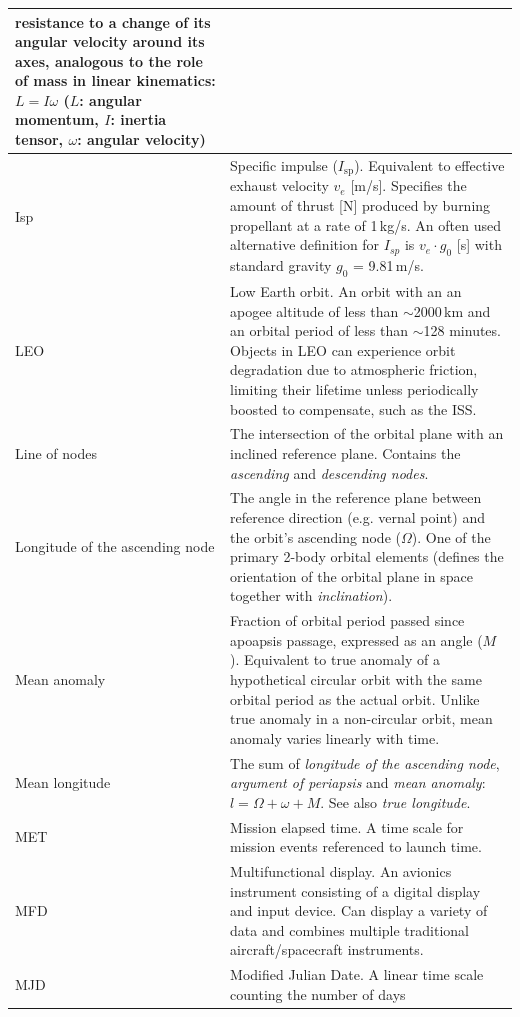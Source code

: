 \documentclass[Orbiter User Manual.tex]{subfiles}
\begin{document}
\begin{longtable}{ >{\RaggedRight}p{} p{} }
		resistance to a change of its angular velocity around its axes,
		analogous to the role of mass in linear kinematics: $L = I\omega$ ($L$:
		angular momentum, $I$: inertia tensor, $\omega$: angular velocity)\\
	\hline
	Isp & Specific impulse ($I_\mathrm{sp}$). Equivalent to effective exhaust
		velocity $v_{e}$ [m/s]. Specifies the amount of thrust [N] produced by
		burning propellant at a rate of 1\,kg/s. An often used alternative
		definition for $I_{sp}$ is $v_{e} \cdot g_{0}$ [s] with standard gravity
		$g_{0}$ = 9.81\,m/s\textsup{2}.\\
	\hline
	LEO & Low Earth orbit. An orbit with an an apogee altitude of less than
		$\sim$2000\,km and an orbital period of less than $\sim$128 minutes.
		Objects in LEO can experience orbit degradation due to atmospheric
		friction, limiting their lifetime unless periodically boosted to
		compensate, such as the ISS.\\
	\hline
	Line of nodes & The intersection of the orbital plane with an inclined
		reference plane. Contains the \emph{ascending} and \emph{descending
		nodes}.\\
	\hline
	Longitude of the ascending node & The angle in the reference plane between
		reference direction (e.g. vernal point) and the orbit's ascending node
		($\Omega$). One of the primary 2-body orbital elements (defines the
		orientation of the orbital plane in space together with
		\emph{inclination}).\\
	\hline
	Mean anomaly & Fraction of orbital period passed since apoapsis passage,
		expressed as an angle ($M$). Equivalent to true anomaly of a
		hypothetical circular orbit with the same orbital period as the actual
		orbit. Unlike true anomaly in a non-circular orbit, mean anomaly varies
		linearly with time.\\
	\hline
	Mean longitude & The sum of \emph{longitude of the ascending node},
		\emph{argument of periapsis} and \emph{mean anomaly}:
		$l = \Omega + \omega + M$. See also \emph{true longitude}.\\
	\hline
	MET & Mission elapsed time. A time scale for mission events referenced to
		launch time. \\
	\hline
	MFD & Multifunctional display. An avionics instrument consisting of a
		digital display and input device. Can display a variety of data and
		combines multiple traditional aircraft/spacecraft instruments.\\
	\hline
	MJD & Modified Julian Date. A linear time scale counting the number of days

\end{longtable}
\end{document}
